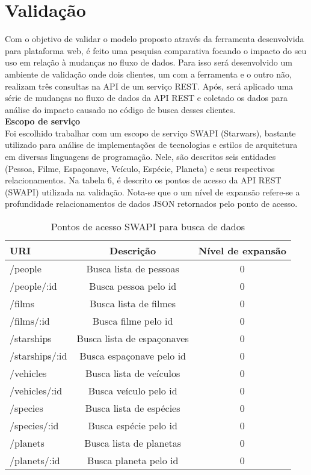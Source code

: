 \section{Validação}

Com o objetivo de validar o modelo proposto através da ferramenta desenvolvida para plataforma web, é feito uma pesquisa comparativa focando o impacto do seu uso em relação à mudanças no fluxo de dados. Para isso será desenvolvido um ambiente de validação onde dois clientes, um com a ferramenta e o outro não, realizam três consultas na API de um serviço REST. Após, será aplicado uma série de mudanças no fluxo de dados da API REST e coletado os dados para análise do impacto causado no código de busca desses clientes. \\

\textbf{Escopo de serviço} \\

Foi escolhido trabalhar com um escopo de serviço SWAPI (Starwars), bastante utilizado para análise de implementações de tecnologias e estilos de arquitetura em diversas linguagens de programação. Nele, são descritos seis entidades (Pessoa, Filme, Espaçonave, Veículo, Espécie, Planeta) e seus respectivos relacionamentos. Na tabela 6, é descrito os pontos de acesso da API REST (SWAPI) utilizada na validação. Nota-se que o um nível de expansão refere-se a profundidade relacionamentos de dados JSON retornados pelo ponto de acesso.

\begin{table}[H]
  \centering
  \begin{tabular}{|l|c|c|}
    \hline
    URI & Descrição & Nível de expansão \\
    \hline
    /people & Busca lista de pessoas & 0 \\
    \hline
    /people/:id & Busca pessoa pelo id & 0 \\
    \hline
    /films & Busca lista de filmes & 0 \\
    \hline
    /films/:id & Busca filme pelo id & 0 \\
    \hline
    /starships & Busca lista de espaçonaves & 0 \\
    \hline
    /starships/:id & Busca espaçonave pelo id & 0 \\
    \hline
    /vehicles & Busca lista de veículos & 0 \\
    \hline
    /vehicles/:id & Busca veículo pelo id & 0 \\
    \hline
    /species & Busca lista de espécies & 0 \\
    \hline
    /species/:id & Busca espécie pelo id & 0 \\
    \hline
    /planets & Busca lista de planetas & 0 \\
    \hline
    /planets/:id & Busca planeta pelo id & 0 \\
    \hline
  \end{tabular}
  \caption{Pontos de acesso SWAPI para busca de dados}
\end{table}

